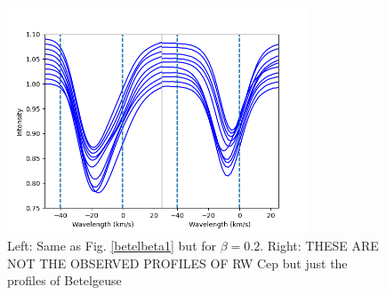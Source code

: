 \documentclass{/Users/art2/TeX/aanda/aa}
\def\kms {km\,s$^{-1}$}
\begin{document}
\begin{figure}
   \includegraphics[width=0.8\textwidth]{Fig6_art74.png}
   \caption{Left: Same as Fig. \ref{betelbeta1} but for $\beta=0.2$. Right: THESE ARE NOT THE OBSERVED PROFILES OF RW Cep but just the profiles of Betelgeuse}
   \label{RWbeta}
   \end{figure}

\end{document}
